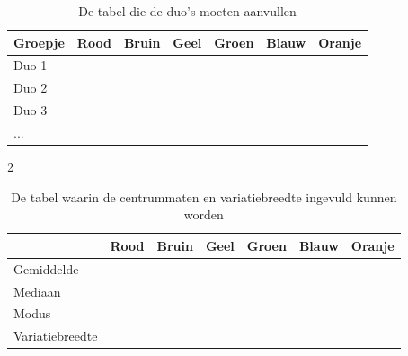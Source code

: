 \begin{table}[H]
 \centering
 \begin{tabular}{|l||r|r|r|r|r|r|}\hline
  Groepje&	Rood&	Bruin& Geel& Groen& Blauw& Oranje\\\hline
  Duo 1&	& & &  &  & \\\hline
  Duo 2&	& & &  &  & \\\hline
  Duo 3&	& & &  &  & \\\hline
   ...&	& & &  &  & \\\hline
  \end{tabular}
  \caption{De tabel die de duo's moeten aanvullen}
  \label{tab: tabel1}
 \end{table}

\begin{multicols}{2}

\end{multicols}
\begin{table}[H]
 \centering
 \begin{tabular}{|l||r|r|r|r|r|r|}\hline
  &	Rood&	Bruin&	Geel& Groen& Blauw& Oranje\\\hline
Gemiddelde&	& & &  &  & \\\hline
Mediaan&	& & &  &  & \\\hline
Modus&	& & &  &  & \\\hline
Variatiebreedte&	& & &  &  & \\\hline
  \end{tabular}
  \caption{De tabel waarin de centrummaten en variatiebreedte ingevuld kunnen worden}
  \label{tab: tabel2}
 \end{table}

